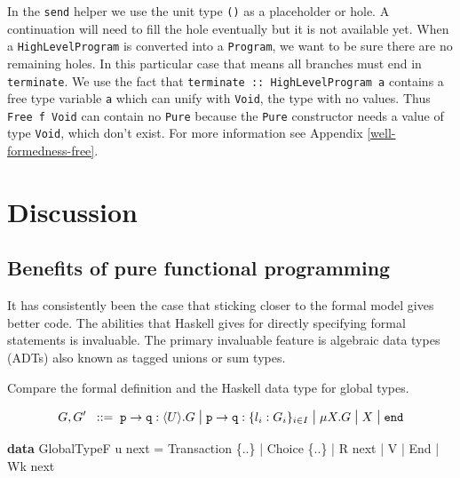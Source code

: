 \documentclass[runningheads,plain]{llncs}
\newenvironment{Shaded}{}{}
\newcommand{\KeywordTok}[1]{\textcolor[rgb]{0.00,0.44,0.13}{\textbf{#1}}}
\newcommand{\DataTypeTok}[1]{\textcolor[rgb]{0.56,0.13,0.00}{#1}}
\newcommand{\FunctionTok}[1]{\textcolor[rgb]{0.02,0.16,0.49}{#1}}
\newcommand{\NormalTok}[1]{#1}
\begin{document}
In the \texttt{send} helper we use the unit type \texttt{()} as a
placeholder or hole. A continuation will need to fill the hole
eventually but it is not available yet. When a \texttt{HighLevelProgram}
is converted into a \texttt{Program}, we want to be sure there are no
remaining holes. In this particular case that means all branches must
end in \texttt{terminate}. We use the fact that
\texttt{terminate\ ::\ HighLevelProgram\ a} contains a free type
variable \texttt{a} which can unify with \texttt{Void}, the type with no
values. Thus \texttt{Free\ f\ Void} can contain no \texttt{Pure} because
the \texttt{Pure} constructor needs a value of type \texttt{Void}, which
don't exist. For more information see Appendix
\ref{well-formedness-free}.

\section{Discussion}\label{discussion}

\subsection{Benefits of pure functional
programming}\label{benefits-of-pure-functional-programming}

It has consistently been the case that sticking closer to the formal
model gives better code. The abilities that Haskell gives for directly
specifying formal statements is invaluable. The primary invaluable
feature is algebraic data types (ADTs) also known as tagged unions or
sum types.

Compare the formal definition and the Haskell data type for global
types.

\begin{align*}
    G, G'  \bnfis & \gtcom{p}{q}{U}{G} %
    \sbnfbar
    \gtcho{p}{q}{\lbl_i}{G_i} %
    \sbnfbar %
    \mu X. G \sbnfbar X \sbnfbar \gend \\
\end{align*}

\begin{Shaded}
\begin{Highlighting}[]
\KeywordTok{data} \DataTypeTok{GlobalTypeF}\NormalTok{ u next }\FunctionTok{=} 
    \DataTypeTok{Transaction}\NormalTok{ \{}\FunctionTok{..}\NormalTok{\} }\FunctionTok{|} \DataTypeTok{Choice}\NormalTok{ \{}\FunctionTok{..}\NormalTok{\}  }\FunctionTok{|} \DataTypeTok{R}\NormalTok{ next }\FunctionTok{|} \DataTypeTok{V} \FunctionTok{|} \DataTypeTok{End} \FunctionTok{|} \DataTypeTok{Wk}\NormalTok{ next}
\end{Highlighting}
\end{Shaded}
\end{document}
